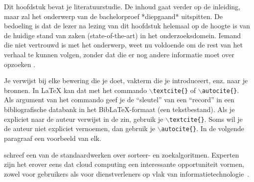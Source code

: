 
Dit hoofdstuk bevat je literatuurstudie. De inhoud gaat verder op de inleiding, maar zal het onderwerp van de bachelorproef *diepgaand* uitspitten. De bedoeling is dat de lezer na lezing van dit hoofdstuk helemaal op de hoogte is van de huidige stand van zaken (state-of-the-art) in het onderzoeksdomein. Iemand die niet vertrouwd is met het onderwerp, weet nu voldoende om de rest van het verhaal te kunnen volgen, zonder dat die er nog andere informatie moet over opzoeken \autocite{Pollefliet2011}.

Je verwijst bij elke bewering die je doet, vakterm die je introduceert, enz. naar je bronnen. In \LaTeX{} kan dat met het commando \texttt{$\backslash${textcite\{\}}} of \texttt{$\backslash${autocite\{\}}}. Als argument van het commando geef je de ``sleutel'' van een ``record'' in een bibliografische databank in het Bib\LaTeX{}-formaat (een tekstbestand). Als je expliciet naar de auteur verwijst in de zin, gebruik je \texttt{$\backslash${}textcite\{\}}.
Soms wil je de auteur niet expliciet vernoemen, dan gebruik je \texttt{$\backslash${}autocite\{\}}. In de volgende paragraaf een voorbeeld van elk.

\textcite{Knuth1998} schreef een van de standaardwerken over sorteer- en zoekalgoritmen. Experten zijn het erover eens dat cloud computing een interessante opportuniteit vormen, zowel voor gebruikers als voor dienstverleners op vlak van informatietechnologie~\autocite{Creeger2009}.

\lipsum[7-20]
